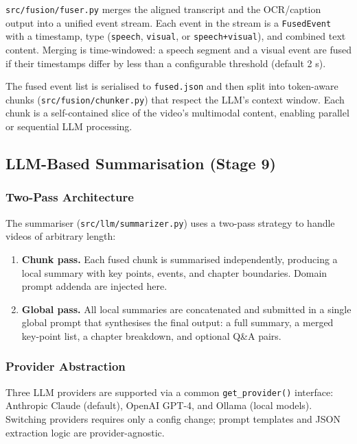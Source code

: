 \documentclass[12pt,a4paper]{article}
\begin{document}
\texttt{src/fusion/fuser.py} merges the aligned transcript and the OCR/caption
output into a unified event stream. Each event in the stream is a \texttt{FusedEvent}
with a timestamp, type (\texttt{speech}, \texttt{visual}, or \texttt{speech+visual}),
and combined text content. Merging is time-windowed: a speech segment and a visual
event are fused if their timestamps differ by less than a configurable threshold
(default 2 s).

The fused event list is serialised to \texttt{fused.json} and then split into
token-aware chunks (\texttt{src/fusion/chunker.py}) that respect the LLM's context
window. Each chunk is a self-contained slice of the video's multimodal content, enabling
parallel or sequential LLM processing.

\subsection{LLM-Based Summarisation (Stage 9)}
\label{subsec:llm}

\subsubsection{Two-Pass Architecture}

The summariser (\texttt{src/llm/summarizer.py}) uses a two-pass strategy to handle
videos of arbitrary length:
\begin{enumerate}[leftmargin=*]
  \item \textbf{Chunk pass.} Each fused chunk is summarised independently, producing a
    local summary with key points, events, and chapter boundaries. Domain prompt
    addenda are injected here.
  \item \textbf{Global pass.} All local summaries are concatenated and submitted in a
    single global prompt that synthesises the final output: a full summary, a merged
    key-point list, a chapter breakdown, and optional Q\&A pairs.
\end{enumerate}

\subsubsection{Provider Abstraction}
Three LLM providers are supported via a common \texttt{get\_provider()} interface:
Anthropic Claude (default), OpenAI GPT-4, and Ollama (local models). Switching
providers requires only a config change; prompt templates and JSON extraction logic are
provider-agnostic.
\end{document}
